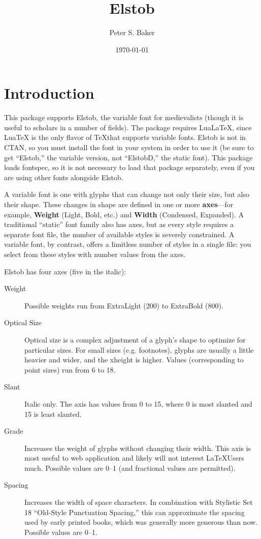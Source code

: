 \documentclass[12pt]{article}
\title{Elstob}
\author{Peter S. Baker}
\date{\today}
\newcommand{\ltech}{Lua\kern-1.5pt\TeX}
\newcommand{\lltech}{Lua\LaTeX}
\newcommand{\fspec}{{\sffamily fontspec}}
\begin{document}
\maketitle

\section{Introduction}

This package supports Elstob, the variable font for medievalists (though it is useful to
scholars in a number of fields). The package requires \lltech, since {\ltech} is
the only flavor of \TeX that supports variable fonts. Elstob is not in CTAN, so you must
install the font in your system in order to use it (be sure to get “Elstob,” the variable
version, not “ElstobD,” the static font). This package loads
\fspec, so it is not necessary to load that package separately, even if you are using
other fonts alongside Elstob.

A variable font is one with glyphs that can change not only their size, but also their
shape. These changes in shape are defined in one or more \textbf{axes}---for example,
\textbf{Weight} (Light, Bold, etc.) and \textbf{Width} (Condensed, Expanded). A traditional
“static” font family also has axes, but as every style requires a separate font file,
the number of available styles is severely constrained. A variable font, by contrast,
offers a limitless number of styles in a single file: you select from these styles with
number values from the axes.

Elstob has four axes (five in the italic):

\begin{description}
    \item[Weight] Possible weights run from ExtraLight (200) to ExtraBold (800). 
    \item[Optical Size] Optical size is a complex adjustment of a glyph's shape to
    optimize for particular sizes. For small sizes (e.g. footnotes), glyphs are usually
    a little heavier and wider, and the xheight is higher. Values (corresponding to
    point sizes) run from 6 to 18.
    \item[Slant] Italic only. The axis has values from 0 to 15, where 0 is most
    slanted and 15 is least slanted.
    \item[Grade] Increases the weight of glyphs without changing their width. This
    axis is most useful to web application and likely will not interest \LaTeX Users
    much. Possible values are 0–1 (and fractional values are permitted).
    \item[Spacing] Increases the width of space characters. In combination with
    Stylistic Set 18 “Old-Style Punctuation Spacing,” this can approximate the
    spacing used by early printed books, which was generally more generous than now.
    Possible values are 0–1.
\end{description}
\end{document}

